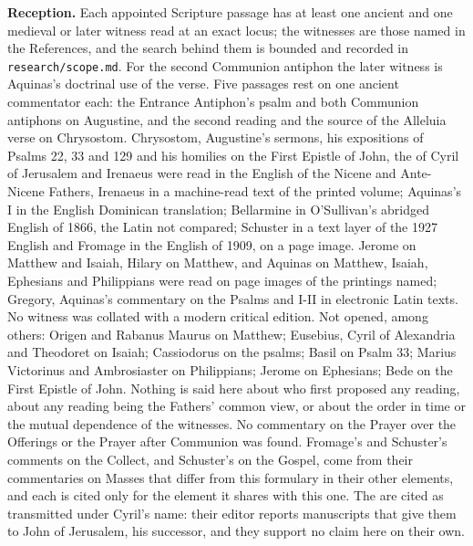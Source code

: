 {\textbf{Reception.} Each appointed Scripture passage has at least one ancient
and one medieval or later witness read at an exact locus; the witnesses are
those named in the References, and the search behind them is bounded and
recorded in \texttt{research/scope.md}. For the second Communion antiphon the
later witness is Aquinas's doctrinal use of the verse. Five passages rest on
one ancient commentator each: the Entrance Antiphon's psalm and both Communion
antiphons on Augustine, and the second reading and the source of the Alleluia
verse on Chrysostom. Chrysostom, Augustine's sermons, his
expositions of Psalms 22, 33 and 129 and his homilies on the First Epistle of
John, the  of Cyril of Jerusalem and Irenaeus were
read in the English of the Nicene and Ante-Nicene Fathers, Irenaeus in a
machine-read text of the printed volume; Aquinas's  I in the
English Dominican translation; Bellarmine in O'Sullivan's abridged English of
1866, the Latin not compared; Schuster in a text layer of the 1927 English and
Fromage in the English of 1909, on a page image. Jerome on Matthew and Isaiah, Hilary on Matthew,
and Aquinas on Matthew, Isaiah, Ephesians and Philippians were read on page
images of the printings named; Gregory, Aquinas's commentary on the Psalms and
 I-II in electronic Latin texts. No witness was collated with a
modern critical edition. Not opened, among others: Origen and Rabanus Maurus
on Matthew; Eusebius, Cyril of Alexandria and Theodoret on Isaiah; Cassiodorus
on the psalms; Basil on Psalm 33; Marius Victorinus and Ambrosiaster on
Philippians; Jerome on Ephesians; Bede on the First Epistle of John. Nothing is
said here about who first proposed any reading, about any reading being the
Fathers' common view, or about the order in time or the mutual dependence of
the witnesses. No commentary on the Prayer over the Offerings or the Prayer
after Communion was found. Fromage's and Schuster's comments on the Collect,
and Schuster's on the Gospel, come from their commentaries on Masses that
differ from this formulary in their other elements, and each is cited only
for the element it shares with this one. The 
are cited as transmitted under Cyril's name: their editor reports manuscripts
that give them to John of Jerusalem, his successor, and they support no claim
here on their own.

}
